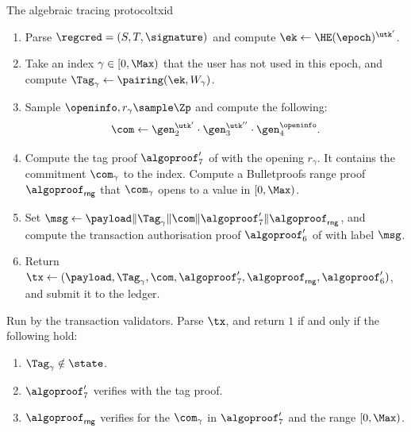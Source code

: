 \begin{protocolbox}{The algebraic tracing protocol}{txid}
\begin{description}
      \begin{enumerate}

	\item Parse $\regcred = (S,T,\signature)$ and compute $\ek \leftarrow
\HE(\epoch)^{\utk'}$.

	\item Take an index $\gamma \in [0,\Max)$ that the user has not used in
this epoch, and compute $\Tag_\gamma \leftarrow
\pairing(\ek,W_\gamma)$.

	\item Sample $\openinfo, r_\gamma \sample \Zp$ and compute the following:
	  \begin{equation*}
	    \com \leftarrow \gen_2^{\utk'} \cdot \gen_3^{\utk''} \cdot
\gen_4^{\openinfo}.
	  \end{equation*}

	\item Compute the tag proof $\algoproof_7'$ of
 with the opening $r_\gamma$. It contains the
commitment $\com_\gamma$ to the index. Compute a Bulletproofs range proof
$\algoproof_{\mathsf{rng}}$ that $\com_\gamma$ opens to a value in $[0,\Max)$.

	\item Set $\msg \leftarrow
\payload\|\Tag_\gamma\|\com\|\algoproof_7'\|
\algoproof_{\mathsf{rng}}$, and compute the transaction authorisation proof
$\algoproof_6'$ of  with label $\msg$.

	\item Return $\tx \leftarrow (\payload,\Tag_\gamma,\com,
\algoproof_7',\algoproof_{\mathsf{rng}},\algoproof_6')$, and submit it to the
ledger.

      \end{enumerate}

    \item[$\{0,1\} \leftarrow \algo{Verify}(\crs,\state,\tx)$ :] Run by the
transaction validators. Parse $\tx$, and return $1$ if and only if the
following hold:

      \begin{enumerate}

	\item $\Tag_\gamma \notin \state$.

	\item $\algoproof_7'$ verifies with the tag proof.

	\item $\algoproof_{\mathsf{rng}}$ verifies for the $\com_\gamma$ in
$\algoproof_7'$ and the range $[0,\Max)$.


\end{enumerate}
\end{description}
\end{protocolbox}
